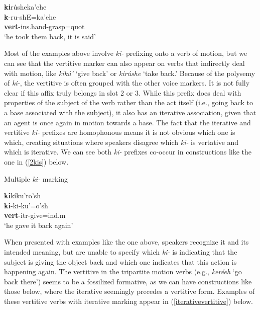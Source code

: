 \begin{exe}
\begin{xlist}
	\item \glll \textbf{ki}rúsheka'ehe\\
	\textbf{k}-ru-shE=ka'ehe\\
	\textbf{vert}-ins.hand-\textnormal{grasp}=quot\\
	\glt `he took them back, it is said' \cite[16]{hollow1973a}
	
	\end{xlist}

\end{exe}

Most of the examples above involve \textit{ki-} prefixing onto a verb of motion, but we can see that the vertitive marker can also appear on verbs that indirectly deal with motion, like \textit{kikú'} `give back' or \textit{kirúshe} `take back.' Because of the polysemy of \textit{ki-}, the vertitive is often grouped with the other voice markers. It is not fully clear if this affix truly belongs in slot 2 or 3. While this prefix does deal with properties of the subject of the verb rather than the act itself (i.e., going back to a base associated with the subject), it also has an iterative association, given that an agent is once again in motion towards a base. The fact that the iterative and vertitive \textit{ki-} prefixes are homophonous means it is not obvious which one is which, creating situations where speakers disagree which \textit{ki-} is vertative and which is iterative. We can see both \textit{ki-} prefixes co-occur in constructions like the one in (\ref{2kis}) below.


\begin{exe}
\item\label{2kis} Multiple \textit{ki-} marking

\glll \textbf{ki}kíku'ro'sh\\
	\textbf{ki}-ki-ku'=o'sh\\
	\textbf{vert}-itr-\textnormal{give}=ind.m\\
	\glt `he gave it back again'

\end{exe}

When presented with examples like the one above, speakers recognize it and its intended meaning, but are unable to specify which \textit{ki-} is indicating that the subject is giving the object back and which one indicates that this action is happening again. The vertitive in the tripartite motion verbs (e.g., \textit{keréeh} `go back there') seems to be a fossilized formative, as we can have constructions like those below, where the iterative seemingly precedes a vertitive form. Examples of these vertitive verbs with iterative marking appear in (\ref{iterativevertitive}) below.

